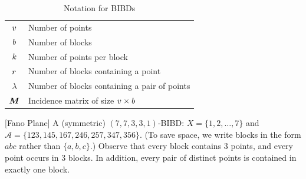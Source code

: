 \documentclass[conference,letterpaper]{IEEEtran}
\begin{document}
\begin{table}[!t]
    \renewcommand{\arraystretch}{1.2}
    \caption{Notation for BIBDs}
    \label{tab:BIBD}
    \centering
    \begin{tabular}{|c|l|}
    \hline
    $v$ & Number of points\\
    $b$ & Number of blocks\\
    $k$  & Number of points per block\\
    $r$ & Number of blocks containing a point\\
    $\lambda$ & Number of blocks containing a pair of points\\
    $\boldsymbol{M}$ & Incidence matrix of size $v \times b$\\
    \hline
    \end{tabular}
\end{table}




\begin{example}
\label{ex:Fano}
[Fano Plane] A (symmetric) $(7,7,3,3,1)$-BIBD: $X = \{1,2,\ldots,7\}$ and $\mathcal{A} = \{123,145,167,246,257,347,356\}$. (To save space, we write blocks in the form $abc$ rather than $\{a,b,c\}$.) Observe that every block contains 3 points, and every point occurs in 3 blocks. In addition, every pair of distinct points is contained in exactly one block.
\end{example}





\end{document}
